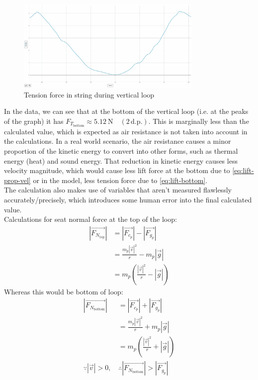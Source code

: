 \documentclass[11pt, a4paper]{article}
\def\ParagraphSpacing{30pt}
\begin{document}
	\begin{figure}[H]
		\centering
		\includegraphics[width=0.8\textwidth]{Images/Tension at Bottom}
		\caption{Tension force in string during vertical loop}
	\end{figure}
	In the data, we can see that at the bottom of the vertical loop (i.e. at the peaks of the graph) it has $F_{T_\text{bottom}}\approx \SI{5.12}{\newton} \quad (2\, \text{d.p.})$. This is marginally less than the calculated value, which is expected as air resistance is not taken into account in the calculations. In a real world scenario, the air resistance causes a minor proportion of the kinetic energy to convert into other forms, such as thermal energy (heat) and sound energy. That reduction in kinetic energy causes less velocity magnitude, which would cause less lift force at the bottom due to \cref{eq:lift-prop-vel} or in the model, less tension force due to \cref{eq:lift-bottom}.\\
	The calculation also makes use of variables that aren't measured flawlessly accurately/precisely, which introduces some human error into the final calculated value.\\[\ParagraphSpacing]
	
	Calculations for seat normal force at the top of the loop:
	\begin{align}
		|\vec{F_{N_\text{top}}}|&=|\vec{F_{c_p}}|-|\vec{F_{g_p}}|\\
		&=\frac{m_p|\vec{v}|^2}{r}-m_p|\vec{g}|\\
		&=m_p\left(\frac{|\vec{v}|^2}{r}-|\vec{g}|\right) \label{eq:FNTop}
	\end{align}
	Whereas this would be bottom of loop:
	\begin{align}
		|\vec{F_{N_\text{bottom}}}|&=|\vec{F_{c_p}}|+|\vec{F_{g_p}}|\\
		&=\frac{m_p|\vec{v}|^2}{r}+m_p|\vec{g}|\\
		&=m_p\left(\frac{|\vec{v}|^2}{r}+|\vec{g}|\right) \label{eq:FNBottom}\\
		\because|\vec{v}|>0,\,&\therefore |\vec{F_{N_\text{bottom}}}|>|\vec{F_{g_p}}| \label{eq:N>g}
	\end{align}
	
\end{document}
